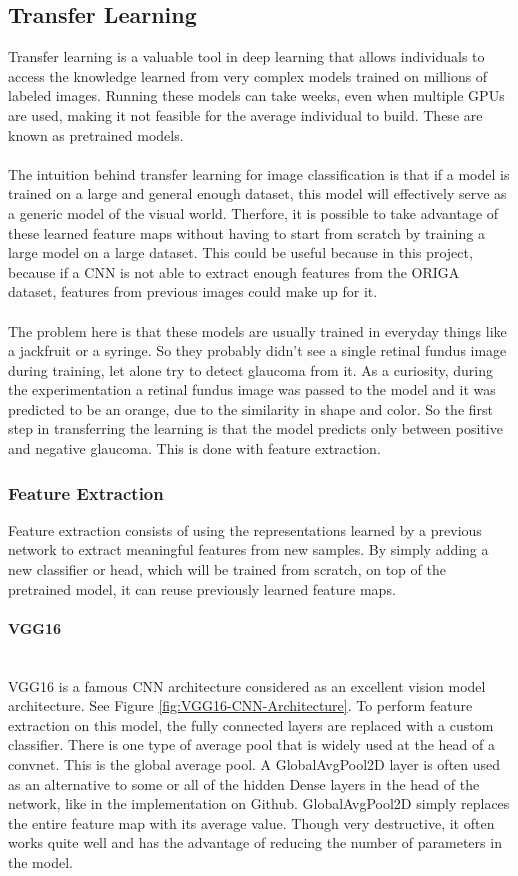\documentclass[11pt, a4paper]{article}
\begin{document}
\subsection{Transfer Learning}
Transfer learning is a valuable tool in deep learning that allows individuals to access the knowledge learned from very complex models trained on millions of labeled images. Running these models can take weeks, even when multiple GPUs are used, making it not feasible for the average individual to build. These are known as pretrained models.
\\\\
The intuition behind transfer learning for image classification is that if a model is trained on a large and general enough dataset, this model will effectively serve as a generic model of the visual world. Therfore, it is possible to take advantage of these learned feature maps without having to start from scratch by training a large model on a large dataset. This could be useful because in this project, because if a CNN is not able to extract enough features from the ORIGA dataset, features from previous images could make up for it.
\\\\
The problem here is that these models are usually trained in everyday things like a jackfruit or a syringe. So they probably didn't see a single retinal fundus image during training, let alone try to detect glaucoma from it. As a curiosity, during the experimentation a retinal fundus image was passed to the model and it was predicted to be an orange, due to the similarity in shape and color. So the first step in transferring the learning is that the model predicts only between positive and negative glaucoma. This is done with feature extraction.

\subsubsection{Feature Extraction}
Feature extraction consists of using the representations learned by a previous network to extract meaningful features from new samples. By simply adding a new classifier or head, which will be trained from scratch, on top of the pretrained model, it can reuse previously learned feature maps.
\paragraph{VGG16}\mbox{}\\
VGG16 is a famous CNN architecture considered as an excellent vision model architecture. See Figure \ref{fig:VGG16-CNN-Architecture}. To perform feature extraction on this model, the fully connected layers are replaced with a custom classifier. There is one type of average pool that is widely used at the head of a convnet.
This is the global average pool. A GlobalAvgPool2D layer is often used as an alternative to some 
or all of the hidden Dense layers in the head of the network, like in the implementation on Github. GlobalAvgPool2D simply replaces the entire feature map with its average value. Though very destructive, it often works quite well and has the advantage of reducing the number of parameters in the model.
\end{document}
